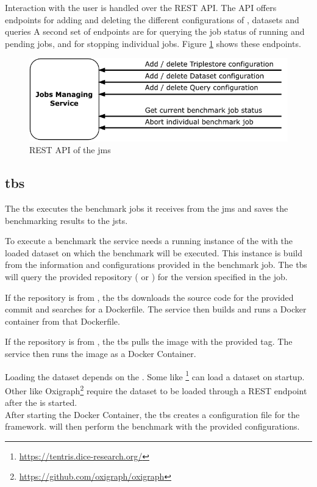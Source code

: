 Interaction with the user is handled over the REST API.
The API offers endpoints for adding and deleting the different configurations of \tsp{}, datasets and queries
A second set of endpoints are for querying the job status of running and pending jobs, and for stopping individual jobs.
Figure \ref{fig:rest_apis_approach_jms} shows these endpoints.
\begin{figure}[tbph]
	\centering
	\includegraphics[width=.57\textwidth]{figures/rest-apis-approach-jms.pdf}
	\caption{REST API of the \acl{jms}}
	\label{fig:rest_apis_approach_jms}
\end{figure}


\subsection{\acl{tbs}}
\label{sec:ts_benchmarking_service}
The \acf{tbs} executes the benchmark jobs it receives from the \ac{jms} and saves the benchmarking results to the \acl*{jsts}.

To execute a benchmark the service needs a running instance of the \ts{} with the loaded dataset on which the benchmark will be executed.
This instance is build from the information and configurations provided in the benchmark job.
The \ac{tbs} will query the provided repository (\gh{} or \dockh{}) for the version specified in the job.

If the repository is from \gh{}, the \ac{tbs} downloads the source code for the provided commit and searches for a Dockerfile.
The service then builds and runs a Docker container from that Dockerfile.

If the repository is from \dockh{}, the \ac{tbs} pulls the image with the provided tag.
The service then runs the image as a Docker Container.

Loading the dataset depends on the \ts{}.
Some \tsp{} like \tentris{}\footnote{\url{https://tentris.dice-research.org/}} can load a dataset on startup.
Other \tsp{} like Oxigraph\footnote{\url{https://github.com/oxigraph/oxigraph}} require the dataset to be loaded through a REST endpoint after the \ts{} is started.
\\

After starting the Docker Container, the \ac{tbs} creates a configuration file for the \iguana{} framework.
\iguana{} will then perform the benchmark with the provided configurations.

